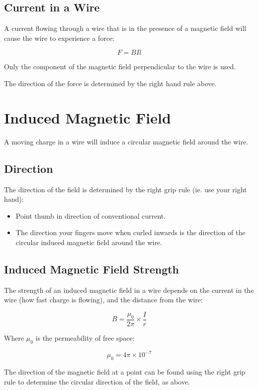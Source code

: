\documentclass[a4paper,11pt]{article}
\begin{document}
\subsection{Current in a Wire}

A current flowing through a wire that is in the presence of a magnetic field
will cause the wire to experience a force:

$$
F = BIl
$$

Only the component of the magnetic field perpendicular to the wire is used.

The direction of the force is determined by the right hand rule above.




\section{Induced Magnetic Field}

A moving charge in a wire will induce a circular magnetic field around the
wire.


\subsection{Direction}

The direction of the field is determined by the right grip rule (ie. use your
right hand):

\begin{itemize}
\item Point thumb in direction of conventional current.
\item The direction your fingers move when curled inwards is the direction of
	the circular induced magnetic field around the wire.
\end{itemize}


\subsection{Induced Magnetic Field Strength}

The strength of an induced magnetic field in a wire depends on the current in
the wire (how fast charge is flowing), and the distance from the wire:

$$
B = \frac{\mu_0}{2\pi} \times \frac{I}{r}
$$

Where $\mu_0$ is the permeability of free space:

$$
\mu_0 = 4\pi \times 10^{-7}
$$

The direction of the magnetic field at a point can be found using the right
grip rule to determine the circular direction of the field, as above.
\end{document}
